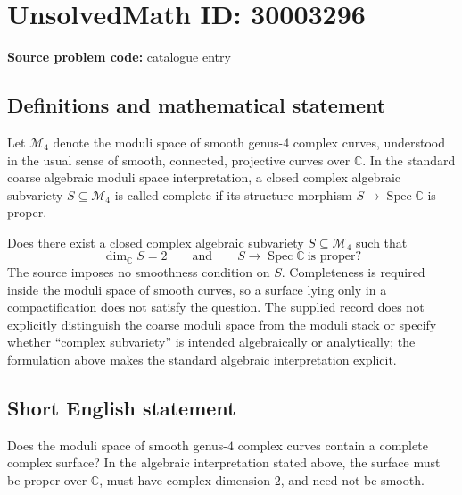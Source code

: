 \documentclass[11pt]{article}
\newcommand{\C}{\mathbb{C}}
\begin{document}
\section*{UnsolvedMath ID: 30003296}
\textbf{Source problem code:} catalogue entry
\subsection{Definitions and mathematical statement}
Let \(\mathcal M_4\) denote the moduli space of smooth genus-\(4\) complex curves, understood in the usual sense of smooth, connected, projective curves over \(\C\). In the standard coarse algebraic moduli space interpretation, a closed complex algebraic subvariety \(S\subseteq\mathcal M_4\) is called complete if its structure morphism \(S\to\operatorname{Spec}\C\) is proper.

Does there exist a closed complex algebraic subvariety \(S\subseteq\mathcal M_4\) such that
\[
\dim_{\C}S=2
\qquad\text{and}\qquad
S\longrightarrow\operatorname{Spec}\C\ \text{is proper}?
\]
The source imposes no smoothness condition on \(S\). Completeness is required inside the moduli space of smooth curves, so a surface lying only in a compactification does not satisfy the question. The supplied record does not explicitly distinguish the coarse moduli space from the moduli stack or specify whether ``complex subvariety'' is intended algebraically or analytically; the formulation above makes the standard algebraic interpretation explicit.
\subsection{Short English statement}
Does the moduli space of smooth genus-\(4\) complex curves contain a complete complex surface? In the algebraic interpretation stated above, the surface must be proper over \(\C\), must have complex dimension \(2\), and need not be smooth.
\end{document}
